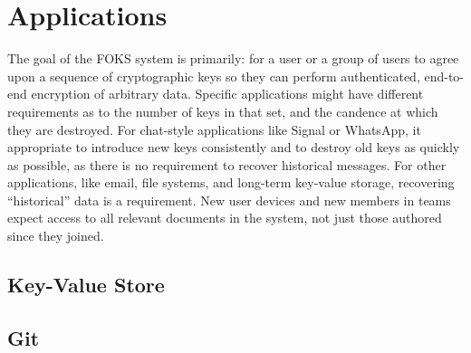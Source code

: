 
\section{Applications}

The goal of the FOKS system is primarily: for a user or a group of users to
agree upon a sequence of cryptographic keys so they can perform authenticated,
end-to-end encryption of arbitrary data. Specific applications might have
different requirements as to the number of keys in that set, and the candence at
which they are destroyed. For chat-style applications like Signal or WhatsApp,
it appropriate to introduce new keys consistently and to destroy old keys as
quickly as possible, as there is no requirement to recover historical messages.
For other applications, like email, file systems, and long-term key-value
storage, recovering ``historical'' data is a requirement. New user devices and
new members in teams expect access to all relevant documents in the system, not
just those authored since they joined.


\subsection{Key-Value Store}

\subsection{Git}